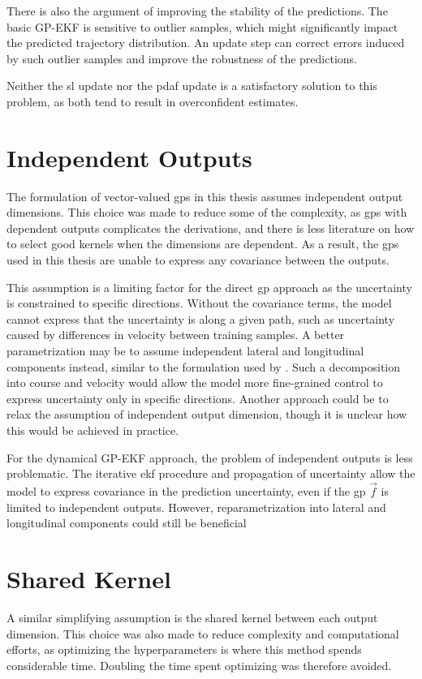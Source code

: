 There is also the argument of improving the stability of the predictions. The basic GP-EKF is sensitive to outlier samples, which might significantly impact the predicted trajectory distribution. An update step can correct errors induced by such outlier samples and improve the robustness of the predictions. 

Neither the \acrshort{sl} update nor the \acrshort{pdaf} update is a satisfactory solution to this problem, as both tend to result in overconfident estimates.  



\section{Independent Outputs}
The formulation of vector-valued \acrshort{gp}s in this thesis assumes independent output dimensions. This choice was made to reduce some of the complexity, as \acrshort{gp}s with dependent outputs complicates the derivations, and there is less literature on how to select good kernels when the dimensions are dependent. As a result, the \acrshort{gp}s used in this thesis are unable to express any covariance between the outputs. 

This assumption is a limiting factor for the direct \acrshort{gp} approach as the uncertainty is constrained to specific directions. Without the covariance terms, the model cannot express that the uncertainty is along a given path, such as uncertainty caused by differences in velocity between training samples. A better parametrization may be to assume independent lateral and longitudinal components instead, similar to the formulation used by \cite{gp_ais_trajectory}. Such a decomposition into course and velocity would allow the model more fine-grained control to express uncertainty only in specific directions. Another approach could be to relax the assumption of independent output dimension, though it is unclear how this would be achieved in practice. 

For the dynamical GP-EKF approach, the problem of independent outputs is less problematic. The iterative \acrshort{ekf} procedure and propagation of uncertainty allow the model to express covariance in the prediction uncertainty, even if the \acrshort{gp} $\vec{f}$ is limited to independent outputs. However, reparametrization into lateral and longitudinal components could still be beneficial

\section{Shared Kernel}
A similar simplifying assumption is the shared kernel between each output dimension. This choice was also made to reduce complexity and computational efforts, as optimizing the hyperparameters is where this method spends considerable time. Doubling the time spent optimizing was therefore avoided. 


